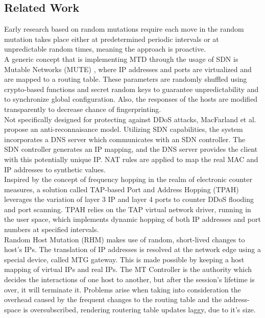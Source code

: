 \documentclass[conference]{IEEEtran}
\begin{document}
\subsection{Related Work}
Early research based on random mutations \cite{al_shaer2013}\cite{jafarian2012} require each move in the random mutation takes place either at predetermined periodic intervals or at unpredictable random times, meaning the approach is proactive. 
\\
A generic concept that is implementing MTD through the usage of SDN is Mutable Networks (MUTE) \cite{mtd_vol1}, where IP addresses and ports are virtualized and are mapped to a routing table. These parameters are randomly shuffled using crypto-based functions and secret random keys to guarantee unpredictability and to synchronize global configuration. Also, the responses of the hosts are modified transparently to decrease chance of fingerprinting.
\\
Not specifically designed for protecting against DDoS attacks, MacFarland et al. \cite{macfarland2015} propose an anti-reconnaisance model. Utilizing SDN capabilities, the system incorporates a DNS server which communicates with an SDN controller. The SDN controller generates an IP mapping, and the DNS server provides the client with this potentially unique IP. NAT rules are applied to map the real MAC and IP addresses to synthetic values.
\\
Inspired by the concept of frequency hopping in the realm of electronic counter measures, a solution called TAP-based Port and Address Hopping (TPAH) \cite{luo2015} leverages the variation of layer 3 IP and layer 4 ports to counter DDoS flooding and port scanning. TPAH relies on the TAP virtual network driver, running in the user space, which implements dynamic hopping of both IP addresses and port numbers at specified intervals.
\\
Random Host Mutation (RHM) \cite{al_shaer2013} makes use of random, short-lived changes to host's IPs. The translation of IP addresses is resolved at the network edge using a special device, called MTG gateway. This is made possible by keeping a host mapping of virtual IPs and real IPs. The MT Controller is the authority which decides the interactions of one host to another, but after the session's lifetime is over, it will terminate it. Problems arise when taking into consideration the overhead caused by the frequent changes to the routing table and the address-space is oversubscribed, rendering routering table updates laggy, due to it's size.
\end{document}
